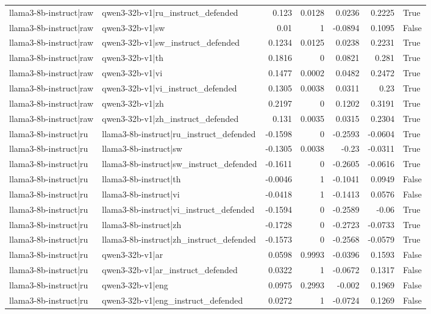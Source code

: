 \begin{table}
\begin{tabular}{l l r r r r l}
llama3-8b-instruct|raw & qwen3-32b-v1|ru_instruct_defended & 0.123 & 0.0128 & 0.0236 & 0.2225 & True \\
llama3-8b-instruct|raw & qwen3-32b-v1|sw & 0.01 & 1 & -0.0894 & 0.1095 & False \\
llama3-8b-instruct|raw & qwen3-32b-v1|sw_instruct_defended & 0.1234 & 0.0125 & 0.0238 & 0.2231 & True \\
llama3-8b-instruct|raw & qwen3-32b-v1|th & 0.1816 & 0 & 0.0821 & 0.281 & True \\
llama3-8b-instruct|raw & qwen3-32b-v1|vi & 0.1477 & 0.0002 & 0.0482 & 0.2472 & True \\
llama3-8b-instruct|raw & qwen3-32b-v1|vi_instruct_defended & 0.1305 & 0.0038 & 0.0311 & 0.23 & True \\
llama3-8b-instruct|raw & qwen3-32b-v1|zh & 0.2197 & 0 & 0.1202 & 0.3191 & True \\
llama3-8b-instruct|raw & qwen3-32b-v1|zh_instruct_defended & 0.131 & 0.0035 & 0.0315 & 0.2304 & True \\
llama3-8b-instruct|ru & llama3-8b-instruct|ru_instruct_defended & -0.1598 & 0 & -0.2593 & -0.0604 & True \\
llama3-8b-instruct|ru & llama3-8b-instruct|sw & -0.1305 & 0.0038 & -0.23 & -0.0311 & True \\
llama3-8b-instruct|ru & llama3-8b-instruct|sw_instruct_defended & -0.1611 & 0 & -0.2605 & -0.0616 & True \\
llama3-8b-instruct|ru & llama3-8b-instruct|th & -0.0046 & 1 & -0.1041 & 0.0949 & False \\
llama3-8b-instruct|ru & llama3-8b-instruct|vi & -0.0418 & 1 & -0.1413 & 0.0576 & False \\
llama3-8b-instruct|ru & llama3-8b-instruct|vi_instruct_defended & -0.1594 & 0 & -0.2589 & -0.06 & True \\
llama3-8b-instruct|ru & llama3-8b-instruct|zh & -0.1728 & 0 & -0.2723 & -0.0733 & True \\
llama3-8b-instruct|ru & llama3-8b-instruct|zh_instruct_defended & -0.1573 & 0 & -0.2568 & -0.0579 & True \\
llama3-8b-instruct|ru & qwen3-32b-v1|ar & 0.0598 & 0.9993 & -0.0396 & 0.1593 & False \\
llama3-8b-instruct|ru & qwen3-32b-v1|ar_instruct_defended & 0.0322 & 1 & -0.0672 & 0.1317 & False \\
llama3-8b-instruct|ru & qwen3-32b-v1|eng & 0.0975 & 0.2993 & -0.002 & 0.1969 & False \\
llama3-8b-instruct|ru & qwen3-32b-v1|eng_instruct_defended & 0.0272 & 1 & -0.0724 & 0.1269 & False \\

\end{tabular}
\end{table}
